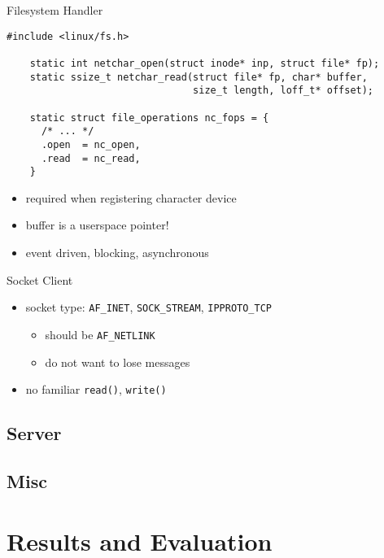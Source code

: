 \documentclass[xcolor=dvipsnames]{beamer}
\begin{document}
\begin{frame}[fragile]{Filesystem Handler}
  \begin{lstlisting}[gobble=4]
    #include <linux/fs.h>

    static int netchar_open(struct inode* inp, struct file* fp);
    static ssize_t netchar_read(struct file* fp, char* buffer,
                                size_t length, loff_t* offset);

    static struct file_operations nc_fops = {
      /* ... */
      .open  = nc_open,
      .read  = nc_read,
    }
  \end{lstlisting}

  \begin{itemize}
    \item<1-> required when registering character device
    \item<2-> buffer is a userspace pointer!
    \item<3-> event driven, blocking, asynchronous
  \end{itemize}
\end{frame}

\begin{frame}[fragile]{Socket Client}
  \begin{itemize}
    \item<1-> socket type: \texttt{AF\_INET}, \texttt{SOCK\_STREAM}, \texttt{IPPROTO\_TCP}
    \begin{itemize}
      \item<2-> should be \texttt{AF\_NETLINK}
      \item<2-> do not want to lose messages
    \end{itemize}
    \item<3-> no familiar \texttt{read()}, \texttt{write()}
  \end{itemize}
\end{frame}

\subsection{Server}

\subsection{Misc}




\section{Results and Evaluation}
\end{document}
